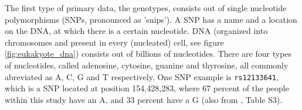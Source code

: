 The first type of primary data, the genotypes, 
consists out of single nucleotide polymorphisms (SNPs, pronounced as 'snips').
A SNP has a name and a location on the DNA, at which there is a certain nucleotide.
DNA (organized into chromosomes and present in every (nucleated) cell, 
see figure \ref{fig:eukakyote_dna}) 
consists out of billions of nucleotides.
There are four types of nucleotides, 
called adenosine, cytosine, guanine and thyrosine, all commonly abreviated
as A, C, G and T respectively.
One SNP example is \verb|rs12133641|, which is a SNP located at position 
154,428,283, where 67 percent of the people within this study have an A,
and 33 percent have a G (also from \cite{ahsan2017relative}, Table S3).


